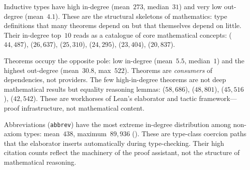 Inductive types have high in-degree (mean~$273$, median~$31$) and very low out-degree (mean~$4.1$). These are the structural skeletons of mathematics: type definitions that many theorems depend on but that themselves depend on little. Their in-degree top~$10$ reads as a catalogue of core mathematical concepts:  ($44{,}487$),  ($26{,}637$),  ($25{,}310$),  ($24{,}295$),  ($23{,}404$),  ($20{,}837$).

Theorems occupy the opposite pole: low in-degree (mean~$5.5$, median~$1$) and the highest out-degree (mean~$30.8$, max~$522$). Theorems are \emph{consumers} of dependencies, not providers. The few high-in-degree theorems are not deep mathematical results but equality reasoning lemmas:  ($58{,}686$),  ($48{,}801$),  ($45{,}516$),  ($42{,}542$). These are workhorses of Lean's elaborator and tactic framework---proof infrastructure, not mathematical content.

Abbreviations (\texttt{abbrev}) have the most extreme in-degree distribution among non-axiom types: mean~$438$, maximum~$89{,}936$ (). These are type-class coercion paths that the elaborator inserts automatically during type-checking. Their high citation counts reflect the machinery of the proof assistant, not the structure of mathematical reasoning.

